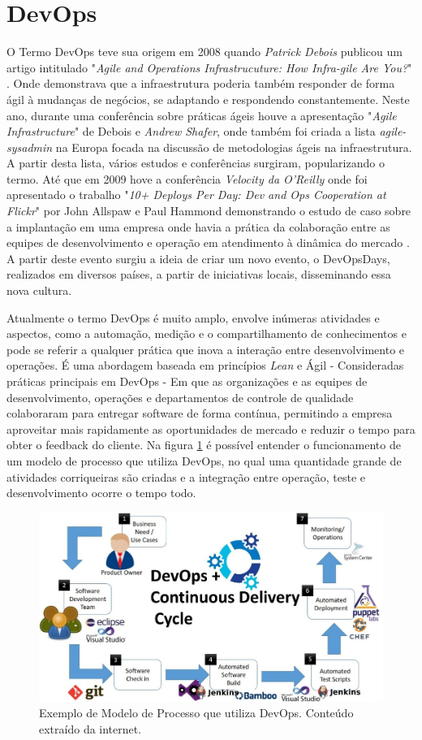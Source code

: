 \section{DevOps}
\label{sec:devops}

O Termo DevOps teve sua origem em 2008 quando \textit{Patrick Debois} publicou um artigo intitulado "\textit{Agile and Operations Infrastrucuture: How Infra-gile Are You?}" \cite{Debois2008}. Onde demonstrava que a infraestrutura poderia também responder de forma ágil à mudanças de negócios, se adaptando e respondendo constantemente. Neste ano, durante uma conferência sobre práticas ágeis houve a apresentação "\textit{Agile Infrastructure}" de Debois e \textit{Andrew Shafer}, onde também foi criada a lista \textit{agile-sysadmin} na Europa focada na discussão de metodologias ágeis na infraestrutura. A partir desta lista, vários estudos e conferências surgiram, popularizando o termo. Até que em 2009 hove a conferência \textit{Velocity da O’Reilly} onde foi apresentado o trabalho "\textit{10+ Deploys Per Day: Dev and Ops Cooperation at Flickr}" por  John Allspaw e Paul Hammond demonstrando o estudo de caso sobre a implantação em uma empresa onde havia a prática da colaboração entre as equipes de desenvolvimento e operação em atendimento à dinâmica do mercado \cite{ALLSPAW2009}. A partir deste evento surgiu a ideia de criar um novo evento, o DevOpsDays, realizados em diversos países, a partir de iniciativas locais, disseminando essa nova cultura.

Atualmente o termo DevOps é muito amplo, envolve inúmeras atividades e aspectos, como a automação, medição e o compartilhamento de conhecimentos \cite{huttermann2012} e pode se referir a qualquer prática que inova a interação entre desenvolvimento e operações. É uma abordagem baseada em princípios \textit{Lean} e Ágil - Consideradas práticas principais em DevOps - Em que as organizações e as equipes de desenvolvimento, operações e departamentos de controle de qualidade colaboraram para entregar software de forma contínua, permitindo a empresa aproveitar mais rapidamente as oportunidades de mercado e reduzir o tempo para obter o feedback do cliente. Na figura \ref{fig:figure24} é possível entender o funcionamento de um modelo de processo que utiliza DevOps, no qual uma quantidade grande de atividades corriqueiras são criadas e a integração entre operação, teste e desenvolvimento ocorre o tempo todo.

\begin{figure}[!ht]
\centering
\includegraphics[width=.75\textwidth]{fig/figura24.png}
\caption{Exemplo de Modelo de Processo que utiliza DevOps. Conteúdo extraído da internet.}
\label{fig:figure24}
\end{figure}

